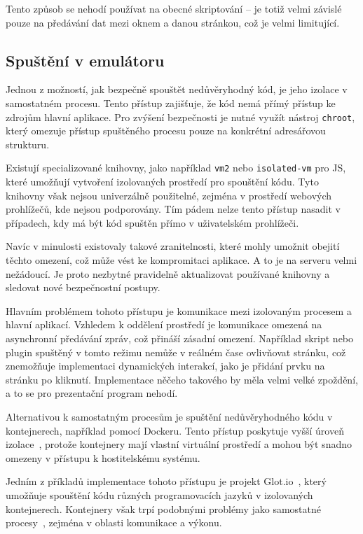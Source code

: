 Tento způsob se nehodí používat na obecné skriptování -- je totiž velmi závislé pouze na předávání dat mezi oknem a danou stránkou, což je velmi limitující.

\subsection{Spuštění v emulátoru}

Jednou z možností, jak bezpečně spouštět nedůvěryhodný kód, je jeho izolace v samostatném procesu. 
Tento přístup zajišťuje, že kód nemá přímý přístup ke zdrojům hlavní aplikace. 
Pro zvýšení bezpečnosti je nutné využít nástroj \texttt{chroot}, který omezuje přístup spuštěného procesu pouze na konkrétní adresářovou strukturu.

Existují specializované knihovny, jako například \texttt{vm2} nebo \texttt{isolated-vm} pro JS, které umožňují vytvoření izolovaných prostředí pro spouštění kódu. 
Tyto knihovny však nejsou univerzálně použitelné, zejména v prostředí webových prohlížečů, kde nejsou podporovány. 
Tím pádem nelze tento přístup nasadit v případech, kdy má být kód spuštěn přímo v uživatelském prohlížeči.

Navíc v minulosti existovaly takové zranitelnosti, které mohly umožnit obejití těchto omezení, což může vést ke kompromitaci aplikace.
A to je na serveru velmi nežádoucí.
Je proto nezbytné pravidelně aktualizovat používané knihovny a sledovat nové bezpečnostní postupy.

Hlavním problémem tohoto přístupu je komunikace mezi izolovaným procesem a hlavní aplikací. 
Vzhledem k oddělení prostředí je komunikace omezená na asynchronní předávání zpráv, což přináší zásadní omezení. 
Například skript nebo plugin spuštěný v tomto režimu nemůže v reálném čase ovlivňovat stránku, což znemožňuje implementaci dynamických interakcí, jako je přidání prvku na stránku po kliknutí. 
Implementace něčeho takového by měla velmi velké zpoždění, a to se pro prezentační program nehodí.

Alternativou k samostatným procesům je spuštění nedůvěryhodného kódu v kontejnerech, například pomocí Dockeru. 
Tento přístup poskytuje vyšší úroveň izolace~\cite{docker}, protože kontejnery mají vlastní virtuální prostředí a mohou být snadno omezeny v přístupu k hostitelskému systému.

Jedním z příkladů implementace tohoto přístupu je projekt Glot.io~\cite{glotio}, který umožňuje spouštění kódu různých programovacích jazyků v izolovaných kontejnerech. 
Kontejnery však trpí podobnými problémy jako samostatné procesy~\cite{glotio}, zejména v oblasti komunikace a výkonu. 

